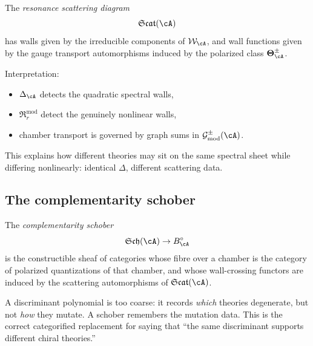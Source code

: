 \begin{definition}
\label{def:nms-resonance-scattering-diagram}
%
The \emph{resonance scattering diagram}
\[
\mathfrak{Scat}(\cA)
\]
has walls given by the irreducible components of $\mathcal W_{\cA}$, and wall functions given by the gauge transport automorphisms induced by the polarized class $\boldsymbol\Theta_{\cA}^{\pm}$.

Interpretation:
\begin{itemize}
\item $\Delta_{\cA}$ detects the quadratic spectral walls,
\item $\mathfrak R_r^{\mathrm{mod}}$ detect the genuinely nonlinear walls,
\item chamber transport is governed by graph sums in $\mathcal G^{\pm}_{\mathrm{mod}}(\cA)$.
\end{itemize}
This explains how different theories may sit on the same spectral sheet while differing nonlinearly: identical $\Delta$, different scattering data.
\end{definition}

\subsection{The complementarity schober}
\label{subsec:nms-complementarity-schober}

\begin{definition}
\label{def:nms-complementarity-schober}
%
The \emph{complementarity schober}
\[
\mathfrak{Sch}(\cA) \to B_{\cA}^\circ
\]
is the constructible sheaf of categories whose fibre over a chamber is the category of polarized quantizations of that chamber, and whose wall-crossing functors are induced by the scattering automorphisms of $\mathfrak{Scat}(\cA)$.
\end{definition}

\begin{remark}
\label{rem:nms-schober-vs-scattering}
A discriminant polynomial is too coarse: it records \emph{which} theories degenerate, but not \emph{how} they mutate. A schober remembers the mutation data. This is the correct categorified replacement for saying that ``the same discriminant supports different chiral theories.''
\end{remark}

